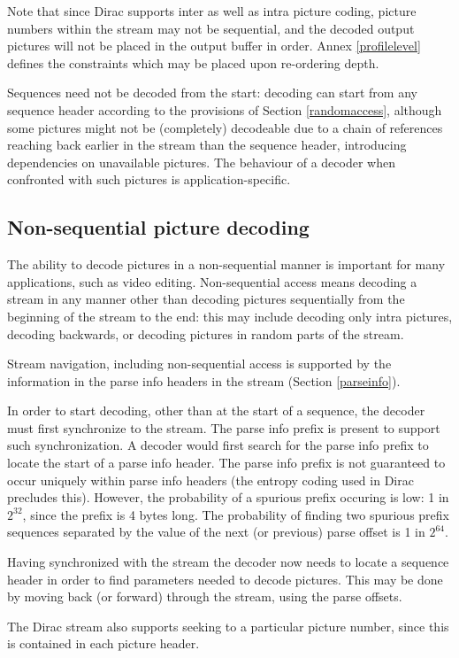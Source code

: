Note that since Dirac supports inter as well as intra picture coding, picture numbers
within the stream may not be sequential, and the decoded output pictures will not be
placed in the output buffer in order. Annex \ref{profilelevel} defines the constraints
which may be placed upon re-ordering depth.

Sequences need not be decoded from the start: decoding can start from any sequence header
according to the provisions of Section \ref{randomaccess}, although some pictures might
not be (completely) decodeable due to a chain of references reaching back earlier in the stream
than the sequence header, introducing dependencies on unavailable pictures. 
The behaviour of a decoder when confronted with such pictures is application-specific.

\subsection{Non-sequential picture decoding}

The ability to decode pictures in a non-sequential manner is important for many
 applications, such as video editing. Non-sequential access means decoding a 
stream in any manner other than decoding pictures sequentially from the beginning 
of the stream to the end: this may include decoding only intra pictures, decoding backwards, or decoding pictures in random parts of the stream. 

Stream navigation, including non-sequential access is supported by the information 
in the parse info headers in the stream (Section \ref{parseinfo}). 

In order to start decoding, other than at the start of a sequence, the decoder 
must first synchronize to the stream. The parse info prefix is present to support such synchronization. A decoder would first search for the parse info prefix to locate 
the start of a parse info header. The parse info prefix is not guaranteed to occur
 uniquely within parse info headers (the entropy coding used in 
Dirac precludes this). However, the probability of a spurious 
prefix occuring is low: 1 in $2^{32}$, since the prefix is 4 bytes long. The probability of finding 
two spurious prefix sequences separated by the value of the next (or previous) parse 
offset is 1 in $2^{64}$.  

Having synchronized with the stream the decoder now needs to locate a sequence header 
in order to find parameters needed to decode pictures. This may be done by moving back (or forward) through the stream, using the parse offsets.

The Dirac stream also supports seeking to a particular picture number, since this
is contained in each picture header.

